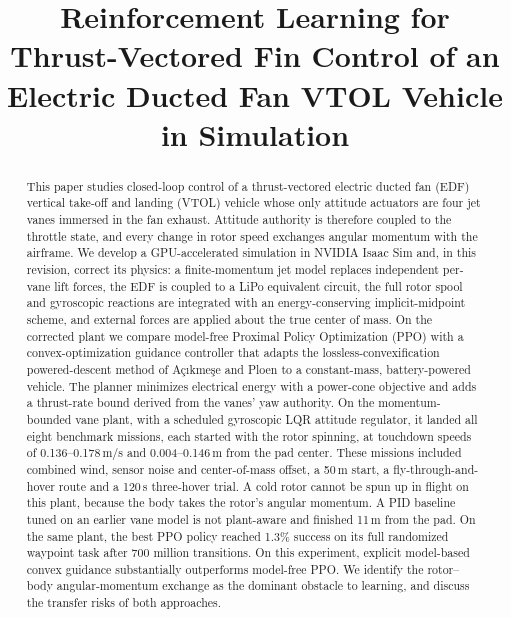 \documentclass[conference]{IEEEtran}
\begin{document}
\pagestyle{plain}

\title{Reinforcement Learning for Thrust-Vectored Fin Control of an Electric Ducted Fan VTOL Vehicle in Simulation}

\author{
}

\maketitle

\begin{abstract}
This paper studies closed-loop control of a thrust-vectored electric ducted fan (EDF) vertical take-off and landing (VTOL) vehicle whose only attitude actuators are four jet vanes immersed in the fan exhaust. Attitude authority is therefore coupled to the throttle state, and every change in rotor speed exchanges angular momentum with the airframe. We develop a GPU-accelerated simulation in NVIDIA Isaac Sim and, in this revision, correct its physics: a finite-momentum jet model replaces independent per-vane lift forces, the EDF is coupled to a LiPo equivalent circuit, the full rotor spool and gyroscopic reactions are integrated with an energy-conserving implicit-midpoint scheme, and external forces are applied about the true center of mass. On the corrected plant we compare model-free Proximal Policy Optimization (PPO) with a convex-optimization guidance controller that adapts the lossless-convexification powered-descent method of A\c{c}{\i}kme\c{s}e and Ploen to a constant-mass, battery-powered vehicle. The planner minimizes electrical energy with a power-cone objective and adds a thrust-rate bound derived from the vanes' yaw authority. On the momentum-bounded vane plant, with a scheduled gyroscopic LQR attitude regulator, it landed all eight benchmark missions, each started with the rotor spinning, at touchdown speeds of 0.136--0.178\,m/s and 0.004--0.146\,m from the pad center. These missions included combined wind, sensor noise and center-of-mass offset, a 50\,m start, a fly-through-and-hover route and a 120\,s three-hover trial. A cold rotor cannot be spun up in flight on this plant, because the body takes the rotor's angular momentum. A PID baseline tuned on an earlier vane model is not plant-aware and finished 11\,m from the pad. On the same plant, the best PPO policy reached 1.3\% success on its full randomized waypoint task after 700 million transitions. On this experiment, explicit model-based convex guidance substantially outperforms model-free PPO. We identify the rotor--body angular-momentum exchange as the dominant obstacle to learning, and discuss the transfer risks of both approaches.
\end{abstract}
\end{document}
